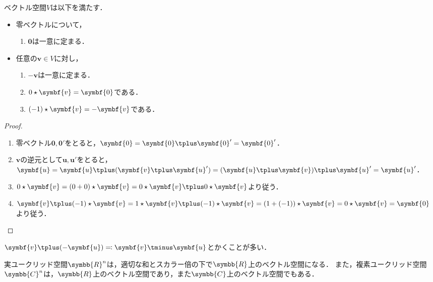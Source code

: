 \documentclass[../sotsu.tex]{subfiles}
\begin{document}
\begin{corollary}
    ベクトル空間$V$は以下を満たす．
    \begin{itemize}
        \item 零ベクトルについて，
        \begin{enumerate}
            \item $\symbf{0}$は一意に定まる．
        \end{enumerate}
        \item 任意の$\symbf{v} \in V$に対し，
        \begin{enumerate}[resume]
            \item $-\symbf{v}$は一意に定まる．
            \item $ 0 \scaprod \symbf{v} = \symbf{0} $である．
            \item $ (-1) \scaprod \symbf{v} = -\symbf{v} $である．
        \end{enumerate}
    \end{itemize}
\end{corollary}

\begin{proof}
    \begin{enumerate}
        \item 零ベクトル$\symbf{0}, \symbf{0}'$をとると，$\symbf{0} = \symbf{0} \vecplus \symbf{0}' = \symbf{0}'$．
        \item $\symbf{v}$の逆元として$\symbf{u}, \symbf{u}'$をとると，
            $\symbf{u}  =  \symbf{u} \vecplus (\symbf{v} \vecplus \symbf{u}')  =  (\symbf{u} \vecplus \symbf{v}) \vecplus \symbf{u}'  =  \symbf{u}'$．
        \item $ 0 \scaprod \symbf{v} = (0 + 0) \scaprod \symbf{v} = 0 \scaprod \symbf{v} \vecplus 0 \scaprod \symbf{v} $より従う．
        \item $ \symbf{v} \vecplus (-1) \scaprod \symbf{v} = 1 \scaprod \symbf{v} \vecplus (-1) \scaprod \symbf{v} = (1 + (-1)) \scaprod \symbf{v} = 0 \scaprod \symbf{v} = \symbf{0} $より従う．
    \end{enumerate}
\end{proof}

$\symbf{v} \vecplus (-\symbf{u}) \eqcolon \symbf{v} \vecminus \symbf{u}$とかくことが多い．


\begin{example}
    実ユークリッド空間$\symbb{R}^n$は，適切な和とスカラー倍の下で$\symbb{R}$上のベクトル空間になる．
    また，複素ユークリッド空間$\symbb{C}^n$は，$\symbb{R}$上のベクトル空間であり，また$\symbb{C}$上のベクトル空間でもある．
\end{example}
\end{document}
